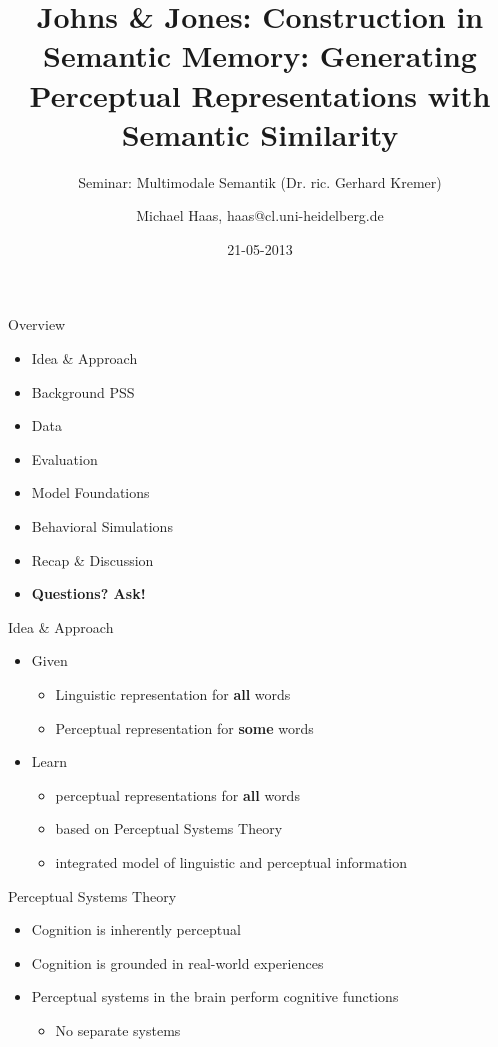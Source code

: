 \documentclass[12pt,a4paper]{beamer}
\author{Michael Haas, haas@cl.uni-heidelberg.de}
\title{Johns \& Jones: Construction in Semantic Memory: Generating Perceptual Representations with Semantic Similarity}
\subtitle{Seminar: Multimodale Semantik (Dr. ric. Gerhard Kremer)}
\date{21-05-2013}
\begin{document}
\begin{frame}
\maketitle
\end{frame}

\begin{frame}{Overview}
\begin{itemize}
\item Idea \& Approach %
\item Background PSS
\item Data
\item Evaluation
    \item Model Foundations
    \item Behavioral Simulations
\item Recap \& Discussion
\item \textbf{Questions? Ask!}
\end{itemize}
\end{frame}


\begin{frame}{Idea \& Approach}
\begin{itemize}
\item Given
    \begin{itemize}
    \item Linguistic representation for \textbf{all} words
    \item Perceptual representation for \textbf{some} words
    \end{itemize}
\item Learn
    \begin{itemize}
    \item perceptual representations for \textbf{all} words
    \item based on Perceptual Systems Theory
    \item integrated model of linguistic and perceptual information
    \end{itemize}
\end{itemize}
\end{frame}

\begin{frame}{Perceptual Systems Theory}
\begin{itemize}
\item Cognition is inherently perceptual
\item Cognition is grounded in real-world experiences
\item Perceptual systems in the brain perform cognitive functions
    \begin{itemize}
    \item No separate systems
    \end{itemize}
\end{itemize}
\end{frame}
\end{document}
